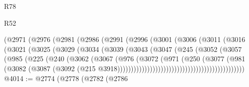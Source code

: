 \begin{lexlean}{R78}
\begin{lexlean}{R52}
\begin{coremodule}
{{{{{{{{{{{{{{{{{{{{{{{{{{{{{{{{{{{{{{{{{{{{{{{{{{{{{{{{{{{{{{{{{{{{{{{{{{{{{{{{{{{{{{{{{{{{{{{{{{{{{{{{{{{{{{{{{{{{{{{{{{{{{{{{{{{{{{{{{{{{{{{{{{{{{{{{{{{{{{{{{{{{{{{{{{{{{{{{{{{{{{{{{{{{{{{{{{{{{{                            (@2971
                              (@2976
                                (@2981
                                  (@2986
                                    (@2991
                                      (@2996
                                        (@3001
                                          (@3006
                                            (@3011
                                              (@3016
                                                (@3021
                                                  (@3025
                                                    (@3029
                                                      (@3034
                                                        (@3039
                                                          (@3043
                                                            (@3047
                                                              (@245
                                                                (@3052
                                                                  (@3057
                                                                    (@985
                                                                      (@225
                                                                        (@240
                                                                          (@3062
                                                                            (@3067
                                                                              (@976
                                                                                (@3072
                                                                                  (@971
                                                                                    (@250
                                                                                      (@3077
                                                                                        (@981
                                                                                          (@3082
                                                                                            (@3087
                                                                                              (@3092
                                                                                                (@215
                                                                                                  @3918)))))))))))))))))))))))))))))))))))))))))))))))
@4014 := @2774
    (@2778
      (@2782
        (@2786
}}}}}}}}}}}}}}}}}}}}}}}}}}}}}}}}}}}}}}}}}}}}}}}}}}}}}}}}}}}}}}}}}}}}}}}}}}}}}}}}}}}}}}}}}}}}}}}}}}}}}}}}}}}}}}}}}}}}}}}}}}}}}}}}}}}}}}}}}}}}}}}}}}}}}}}}}}}}}}}}}}}}}}}}}}}}}}}}}}}}}}}}}}}}}}}}}}}}}}
\end{coremodule}
\end{lexlean}
\end{lexlean}
